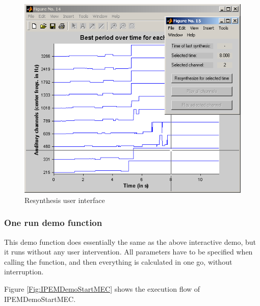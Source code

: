 \begin{figure}
    \centering
    \includegraphics[width=\IPEMDefaultFigureWidth]{Graphics/MECDemoPhotekTheLighteningUI}
    \caption{Resynthesis user interface}
    \label{Fig:MECDemoUI}
\end{figure}

\subsubsection*{One run demo function}

This demo function does essentially the same as the above
interactive demo, but it runs without any user intervention. All
parameters have to be specified when calling the function, and
then everything is calculated in one go, without interruption.

Figure \ref{Fig:IPEMDemoStartMEC} shows the execution flow of
IPEMDemoStartMEC.

